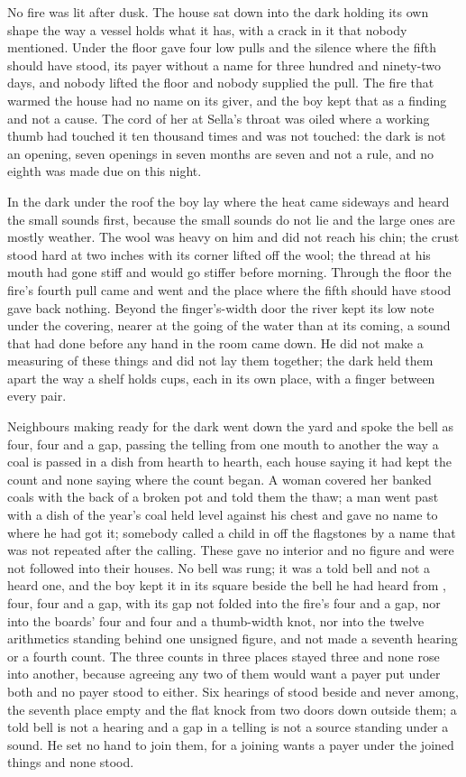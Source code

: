 \scenebreak

No fire was lit after dusk. The house sat down into the dark holding its own shape the way a vessel holds what it has, with a crack in it that nobody mentioned. Under the floor  gave four low pulls and the silence where the fifth should have stood, its payer without a name for three hundred and ninety-two days, and nobody lifted the floor and nobody supplied the pull. The fire that warmed the house had no name on its giver, and the boy kept that as a finding and not a cause. The cord of her  at Sella's throat was oiled where a working thumb had touched it ten thousand times and was not touched: the dark is not an opening, seven openings in seven months are seven and not a rule, and no eighth was made due on this night.

In the dark under the roof the boy lay where the heat came sideways and heard the small sounds first, because the small sounds do not lie and the large ones are mostly weather. The wool was heavy on him and did not reach his chin; the crust stood hard at two inches with its corner lifted off the wool; the thread at his mouth had gone stiff and would go stiffer before morning. Through the floor the fire's fourth pull came and went and the place where the fifth should have stood gave back nothing. Beyond the finger's-width door the river kept its low note under the covering, nearer at the going of the water than at its coming, a sound that had done before any hand in the room came down. He did not make a measuring of these things and did not lay them together; the dark held them apart the way a shelf holds cups, each in its own place, with a finger between every pair.

Neighbours making ready for the dark went down the yard and spoke the bell as four, four and a gap, passing the telling from one mouth to another the way a coal is passed in a dish from hearth to hearth, each house saying it had kept the count and none saying where the count began. A woman covered her banked coals with the back of a broken pot and told them the thaw; a man went past with a dish of the year's coal held level against his chest and gave no name to where he had got it; somebody called a child in off the flagstones by a name that was not repeated after the calling. These gave no interior and no figure and were not followed into their houses. No bell was rung; it was a told bell and not a heard one, and the boy kept it in its square beside the bell he had heard from , four, four and a gap, with its gap not folded into the fire's four and a gap, nor into the boards' four and four and a thumb-width knot, nor into the twelve arithmetics standing behind one unsigned figure, and not made a seventh hearing or a fourth count. The three counts in three places stayed three and none rose into another, because agreeing any two of them would want a payer put under both and no payer stood to either. Six hearings of  stood beside and never among, the seventh place empty and the flat knock from two doors down outside them; a told bell is not a hearing and a gap in a telling is not a source standing under a sound. He set no hand to join them, for a joining wants a payer under the joined things and none stood.

